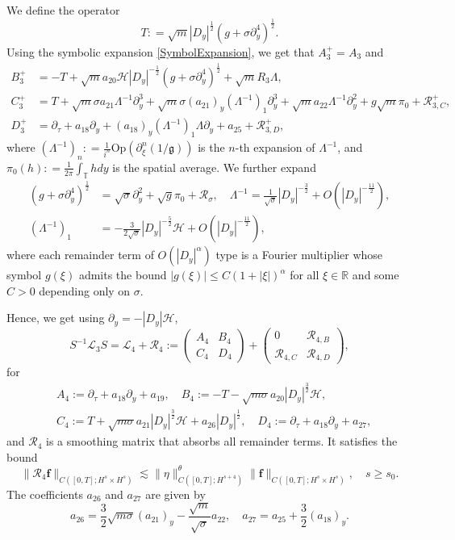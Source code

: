 \documentclass[12pt]{amsart}
\theoremstyle{remark}
\theoremstyle{definition}
\numberwithin{equation}{section}
\newcommand{\p}{\partial}
\newcommand{\R}{\mathbb{R}}
\newcommand{\al}{\alpha}
\newcommand{\f}{\frac}
\newcommand{\T}{{\mathbb T}}
\newcommand{\mH}{\mathcal{H}}
\newcommand{\mL}{\mathcal{L}}
\newcommand{\mR}{\mathcal{R}}
\newcommand{\inv}{^{-1}}
\begin{document}
We define the operator 
\begin{equation} \label{TDef}
    T : = \sqrt{m}|D_y|^\f12 (g+\sigma \p_y^4)^\f12.
\end{equation}
Using the symbolic expansion \eqref{SymbolExpansion}, we get that $A_3^+ = A_3$ and 
\begin{align*}
B_3^+ &= -T+ \sqrt{m}a_{20} \mH |D_y|^{-\f12} (g+\sigma \p_y^4)^\f12 + \sqrt{m} R_3 \Lambda,\\
C_3^+ &=  T+ \sqrt{m}\sigma a_{21}\Lambda^{-1} \p_y^3 +  \sqrt{m}\sigma (a_{21})_y (\Lambda^{-1})_1 \p_y^3 + \sqrt{m}a_{22} \Lambda^{-1}\p_y^2 +g\sqrt{m}\pi_0+\mR_{3,C}^+,\\
D_3^+& =  \p_\tau + a_{18}\p_y + (a_{18})_y(\Lambda^{-1})_1 \Lambda \p_y + a_{25} + \mR_{3,D}^+,
\end{align*}
where $(\Lambda^{-1})_n : =\frac{1}{i^n}$Op$(\p_\xi^n(1/\mathfrak{g}))$ is the $n$-th expansion of $\Lambda^{-1}$, and $\pi_0(h): = \frac{1}{2\pi}\int_\T h dy$ is the spatial average. 
We further expand
\begin{align*}
 (g+\sigma \p_y^4)^\f12 &=  \sqrt{\sigma} \p_y^2 + \sqrt{g}\pi_0 + \mR_\sigma, \quad
 \Lambda^{-1} = \f{1}{\sqrt{\sigma}} |D_y|^{-\f32} + O(|D_y|^{-\frac{11}{2}}), \\
 (\Lambda^{-1})_1 &= -\f{3}{2\sqrt{\sigma}} |D_y|^{-\f52}\mH + O(|D_y|^{-\frac{11}{2}}),
\end{align*}
where each remainder term of $O(|D_y|^\al)$ type is a Fourier multiplier whose symbol $g(\xi)$ admits the bound $|g(\xi)| \leq C(1+ |\xi|)^\al$ for all $\xi \in \R$ and some $C>0$ depending only on $\sigma$.

Hence, we get using $\p_y = -|D_y|\mH$,
\begin{equation} \label{SLThreeConjugation}
S\inv \mL_3 S
= \mL_4 + \mR_4 := \begin{pmatrix} A_4 & B_4 \\ 
C_4 & D_4 \end{pmatrix} +  \begin{pmatrix} 0 & \mR_{4,B} \\ 
\mR_{4,C} & \mR_{4,D} \end{pmatrix},
\end{equation}
for 
\begin{align*}
&A_4 := \p_\tau+ a_{18} \p_y + a_{19}, \quad B_4 := -T - \sqrt{m\sigma} a_{20} |D_y|^\f{3}{2}\mH, \\
&C_4 := T + \sqrt{m\sigma} a_{21} |D_y|^\f{3} {2}\mH +a_{26}|D_y|^{\f12}, \quad D_4 := \p_\tau+ a_{18} \p_y + a_{27},
\end{align*}
and $\mR_4$ is a smoothing matrix that absorbs all remainder terms.
It satisfies the bound 
\begin{equation*}
\|\mR_4 \mathbf{f} \|_{C([0,T];H^{s}\times H^s)} \lesssim \|\eta\|^\theta_{C([0,T];H^{s+4})} \|\mathbf{f}\|_{C([0,T];H^{s}\times H^s)}, \quad s \geq s_0.
\end{equation*}
The coefficients $a_{26}$ and $a_{27}$ are given by
\begin{equation*}
 a_{26} = \f32 \sqrt{m\sigma} (a_{21})_y - \f{\sqrt{m}}{\sqrt{\sigma}}a_{22} ,\quad a_{27} =  a_{25} + \f32 (a_{18})_y.
\end{equation*}
\end{document}
